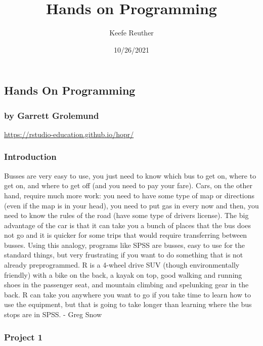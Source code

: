 \documentclass[
]{article}
\title{Hands on Programming}
\author{Keefe Reuther}
\date{10/26/2021}
\begin{document}
\maketitle

\hypertarget{hands-on-programming}{%
\subsection{Hands On Programming}\label{hands-on-programming}}

\hypertarget{by-garrett-grolemund}{%
\subsubsection{by Garrett Grolemund}\label{by-garrett-grolemund}}

\url{https://rstudio-education.github.io/hopr/}

\hypertarget{introduction}{%
\subsubsection{Introduction}\label{introduction}}

Busses are very easy to use, you just need to know which bus to get on,
where to get on, and where to get off (and you need to pay your fare).
Cars, on the other hand, require much more work: you need to have some
type of map or directions (even if the map is in your head), you need to
put gas in every now and then, you need to know the rules of the road
(have some type of drivers license). The big advantage of the car is
that it can take you a bunch of places that the bus does not go and it
is quicker for some trips that would require transferring between
busses. Using this analogy, programs like SPSS are busses, easy to use
for the standard things, but very frustrating if you want to do
something that is not already preprogrammed. R is a 4-wheel drive SUV
(though environmentally friendly) with a bike on the back, a kayak on
top, good walking and running shoes in the passenger seat, and mountain
climbing and spelunking gear in the back. R can take you anywhere you
want to go if you take time to learn how to use the equipment, but that
is going to take longer than learning where the bus stops are in SPSS. -
Greg Snow

\hypertarget{project-1}{%
\subsubsection{Project 1}\label{project-1}}
\end{document}
